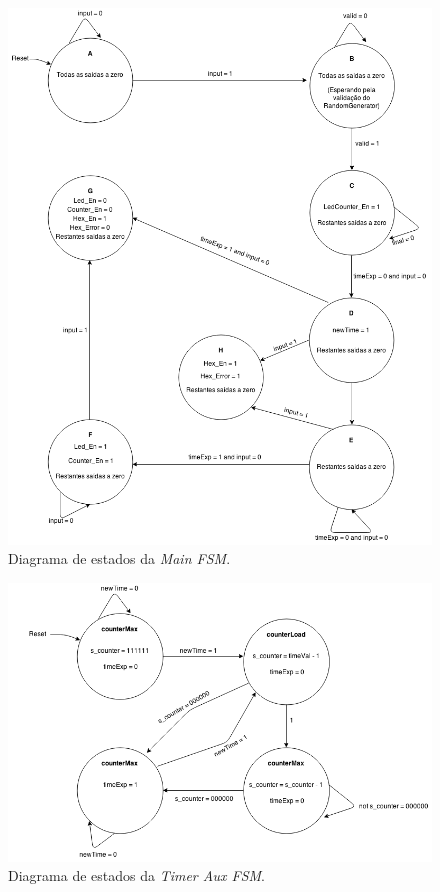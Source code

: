 \documentclass[a4paper,11pt,onecolumn]{report}
\begin{document}
\begin{figure}[h]
\centerline{\includegraphics[scale=0.4]{Images/MainFSMDiagram}}
\caption{Diagrama de estados da \textit{Main FSM}.}
\label{figmainfsm}
\end{figure}

\pagebreak

\begin{figure}[h]
\centerline{\includegraphics[scale=0.33]{Images/TimerAuxFSMDiagram}}
\caption{Diagrama de estados da \textit{Timer Aux FSM}.}
\label{figtimerfsm}
\end{figure}
\end{document}
